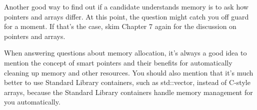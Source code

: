 Another good way to find out if a candidate understands memory is to ask how pointers and arrays differ. At this point, the question might catch you off guard for a moment. If that’s the case, skim Chapter 7 again for the discussion on pointers and arrays.

When answering questions about memory allocation, it’s always a good idea to mention the concept of smart pointers and their benefits for automatically cleaning up memory and other resources. You should also mention that it’s much better to use Standard Library containers, such as std::vector, instead of C-style arrays, because the Standard Library containers handle memory management for you automatically.







